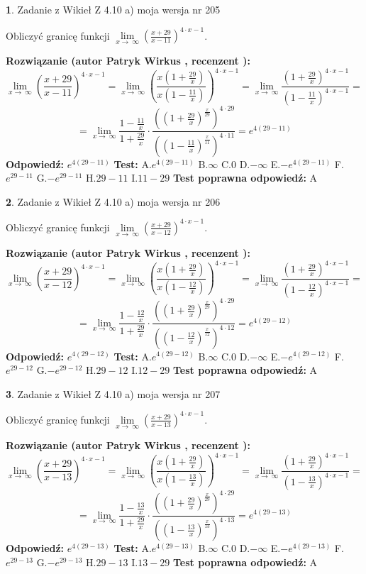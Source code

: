 \documentclass[12pt, a4paper]{article}
\theoremstyle{definition} %
\newtheorem{zad}{}
\newcommand{\zadStart}[1]{\begin{zad}#1\newline}
\newcommand{\zadStop}{\end{zad}}
\newcommand{\rozwStart}[2]{\noindent \textbf{Rozwiązanie (autor #1 , recenzent #2): }\newline}
\newcommand{\rozwStop}{\newline}
\newcommand{\odpStart}{\noindent \textbf{Odpowiedź:}\newline}
\newcommand{\odpStop}{\newline}
\newcommand{\testStart}{\noindent \textbf{Test:}\newline}
\newcommand{\testStop}{\newline}
\newcommand{\kluczStart}{\noindent \textbf{Test poprawna odpowiedź:}\newline}
\newcommand{\kluczStop}{\newline}
\begin{document}
\zadStart{Zadanie z Wikieł Z 4.10 a) moja wersja nr 205}


Obliczyć granicę funkcji  $\lim\limits_{x\to\ \infty}(\frac{x+29}{x-11})^{4\cdot x-1}$.
\zadStop
\rozwStart{Patryk Wirkus}{}
$$\lim\limits_{x\to\ \infty}(\frac{x+29}{x-11})^{4\cdot x-1} = \lim\limits_{x\to\ \infty}(\frac{x(1+\frac{29}{x})}{x(1-\frac{11}{x})})^{4\cdot x-1}=\lim\limits_{x\to\ \infty}\frac{(1+\frac{29}{x})^{4\cdot x-1}}{(1-\frac{11}{x})^{4\cdot x-1}}=$$
$$=\lim\limits_{x\to\ \infty}\frac{1-\frac{11}{x}}{1+\frac{29}{x}}\cdot\frac{((1+\frac{29}{x})^{\frac{x}{29}})^{4\cdot29}}{((1-\frac{11}{x})^{\frac{x}{11}})^{4\cdot11}}=e^{4(29-11)}$$
\rozwStop
\odpStart
$e^{4(29-11)}$
\odpStop
\testStart
A.$e^{4(29-11)}$ B.$\infty$ C.$0$ D.$-\infty$ E.$-e^{4(29-11)}$
F.$e^{29-11}$ G.$-e^{29-11}$
H.$29-11$
I.$11-29$
\testStop
\kluczStart
A
\kluczStop



\zadStart{Zadanie z Wikieł Z 4.10 a) moja wersja nr 206}


Obliczyć granicę funkcji  $\lim\limits_{x\to\ \infty}(\frac{x+29}{x-12})^{4\cdot x-1}$.
\zadStop
\rozwStart{Patryk Wirkus}{}
$$\lim\limits_{x\to\ \infty}(\frac{x+29}{x-12})^{4\cdot x-1} = \lim\limits_{x\to\ \infty}(\frac{x(1+\frac{29}{x})}{x(1-\frac{12}{x})})^{4\cdot x-1}=\lim\limits_{x\to\ \infty}\frac{(1+\frac{29}{x})^{4\cdot x-1}}{(1-\frac{12}{x})^{4\cdot x-1}}=$$
$$=\lim\limits_{x\to\ \infty}\frac{1-\frac{12}{x}}{1+\frac{29}{x}}\cdot\frac{((1+\frac{29}{x})^{\frac{x}{29}})^{4\cdot29}}{((1-\frac{12}{x})^{\frac{x}{12}})^{4\cdot12}}=e^{4(29-12)}$$
\rozwStop
\odpStart
$e^{4(29-12)}$
\odpStop
\testStart
A.$e^{4(29-12)}$ B.$\infty$ C.$0$ D.$-\infty$ E.$-e^{4(29-12)}$
F.$e^{29-12}$ G.$-e^{29-12}$
H.$29-12$
I.$12-29$
\testStop
\kluczStart
A
\kluczStop



\zadStart{Zadanie z Wikieł Z 4.10 a) moja wersja nr 207}


Obliczyć granicę funkcji  $\lim\limits_{x\to\ \infty}(\frac{x+29}{x-13})^{4\cdot x-1}$.
\zadStop
\rozwStart{Patryk Wirkus}{}
$$\lim\limits_{x\to\ \infty}(\frac{x+29}{x-13})^{4\cdot x-1} = \lim\limits_{x\to\ \infty}(\frac{x(1+\frac{29}{x})}{x(1-\frac{13}{x})})^{4\cdot x-1}=\lim\limits_{x\to\ \infty}\frac{(1+\frac{29}{x})^{4\cdot x-1}}{(1-\frac{13}{x})^{4\cdot x-1}}=$$
$$=\lim\limits_{x\to\ \infty}\frac{1-\frac{13}{x}}{1+\frac{29}{x}}\cdot\frac{((1+\frac{29}{x})^{\frac{x}{29}})^{4\cdot29}}{((1-\frac{13}{x})^{\frac{x}{13}})^{4\cdot13}}=e^{4(29-13)}$$
\rozwStop
\odpStart
$e^{4(29-13)}$
\odpStop
\testStart
A.$e^{4(29-13)}$ B.$\infty$ C.$0$ D.$-\infty$ E.$-e^{4(29-13)}$
F.$e^{29-13}$ G.$-e^{29-13}$
H.$29-13$
I.$13-29$
\testStop
\kluczStart
A
\kluczStop
\end{document}
